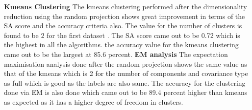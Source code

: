 \documentclass[a4paper,12pt]{article}
\begin{document}
\textbf{Kmeans Clustering} The kmeans clustering performed after the dimensionality reduction using the random projection shows great improvement in terms of the SA score and the accuracy criteria also. The value for the number of clusters is found to be 2 for the first dataset . The SA score came out to be 0.72 which is the highest in all the algorithms. the accuracy value for the kmeans clustering came out to be the largest at 85.6 percent. \newline 
\textbf{EM analysis} The expectation maximisation analysis done after  the random projection shows the same value as that of the kmeans which is 2 for the number of components and covariance type as full which is good as the labels are also same. The accuracy for the clustering done via EM is also done which came out to be 89.4 percent higher than kmeans as expected as it has a higher degree of freedom in clusters.
\end{document}
